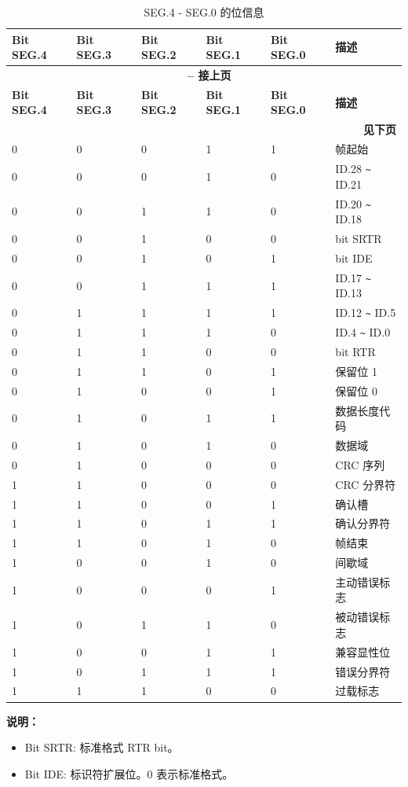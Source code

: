 \begin{longtable}[c]{|p{2cm}<{\centering}|p{2cm}<{\centering}|p{2cm}<{\centering}|p{2cm}<{\centering}|p{2cm}<{\centering}|p{4cm}|}
    \caption{SEG.4 - SEG.0 的位信息}
    \label{tab:twai-bit-info-seg4-seg0}\\
    \hline
    \rowcolor{lightgray}
   \textbf{Bit SEG.4} & \textbf{Bit SEG.3} & \textbf{Bit SEG.2} & \textbf{Bit SEG.1} & \textbf{Bit SEG.0} & \textbf{描述} \\\hline
   \endfirsthead
   
   \multicolumn{6}{c}{\bfseries \tablename\ \thetable{} -- 接上页}\\\hline
   
   \rowcolor{lightgray}
   \textbf{Bit SEG.4} & \textbf{Bit SEG.3} & \textbf{Bit SEG.2} & \textbf{Bit SEG.1} & \textbf{Bit SEG.0} & \textbf{描述} \\\hline
   \endhead
   \multicolumn{6}{r}{\textbf{见下页}} \\
   \endfoot
   \endlastfoot
   
    0 & 0 & 0 & 1 & 1 & 帧起始
    \\\hline
    0 & 0 & 0 & 1 & 0 & ID.28 \verb+~+ ID.21
    \\\hline
    0 & 0 & 1 & 1 & 0 & ID.20 \verb+~+ ID.18
    \\\hline
    0 & 0 & 1 & 0 & 0 & bit SRTR
    \\\hline
    0 & 0 & 1 & 0 & 1 & bit IDE
    \\\hline
    0 & 0 & 1 & 1 & 1 & ID.17 \verb+~+ ID.13
    \\\hline
    0 & 1 & 1 & 1 & 1 & ID.12 \verb+~+ ID.5
    \\\hline
    0 & 1 & 1 & 1 & 0 & ID.4 \verb+~+ ID.0
    \\\hline
    0 & 1 & 1 & 0 & 0 & bit RTR
    \\\hline
    0 & 1 & 1 & 0 & 1 & 保留位 1
    \\\hline
    0 & 1 & 0 & 0 & 1 & 保留位 0
    \\\hline
    0 & 1 & 0 & 1 & 1 & 数据长度代码
    \\\hline
    0 & 1 & 0 & 1 & 0 & 数据域
    \\\hline
    0 & 1 & 0 & 0 & 0 & CRC 序列
    \\\hline
    1 & 1 & 0 & 0 & 0 & CRC 分界符
    \\\hline
    1 & 1 & 0 & 0 & 1 & 确认槽
    \\\hline
    1 & 1 & 0 & 1 & 1 & 确认分界符
    \\\hline
    1 & 1 & 0 & 1 & 0 & 帧结束
    \\\hline
    1 & 0 & 0 & 1 & 0 & 间歇域
    \\\hline
    1 & 0 & 0 & 0 & 1 & 主动错误标志
    \\\hline
    1 & 0 & 1 & 1 & 0 & 被动错误标志
    \\\hline
    1 & 0 & 0 & 1 & 1 & 兼容显性位
    \\\hline
    1 & 0 & 1 & 1 & 1 & 错误分界符
    \\\hline
    1 & 1 & 1 & 0 & 0 & 过载标志
    \\\hline
\end{longtable}
\vspace{-1.5em}
{\bfseries 说明：}\\
\begin{itemize}
    \item Bit SRTR: 标准格式 RTR bit。
    \item Bit IDE: 标识符扩展位。0 表示标准格式。
\end{itemize}
